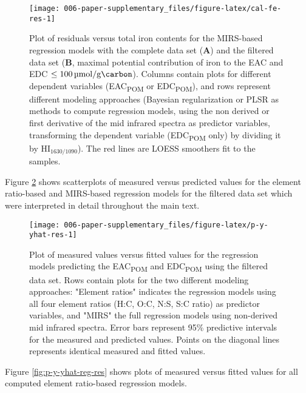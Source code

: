 \documentclass[draft,linenumbers]{agujournal2018}
\begin{document}
\begin{figure}[H]

{\centering \texttt{[image: 006-paper-supplementary\_files/figure-latex/cal-fe-res-1]} 

}

\caption{Plot of residuals versus total iron contents for the MIRS-based regression models with the complete data set (\textbf{A}) and the filtered data set (\textbf{B}, maximal potential contribution of iron to the EAC and EDC $\le\SI{100}{\micro\mol\per\gram\carbon}$). Columns contain plots for different dependent variables (EAC\textsubscript{POM} or EDC\textsubscript{POM}), and rows represent different modeling approaches (Bayesian regularization or PLSR as methods to compute regression models, using the non derived or first derivative of the mid infrared spectra as predictor variables, transforming the dependent variable (EDC\textsubscript{POM} only) by dividing it by HI$_\text{1630/1090}$). The red lines are LOESS smoothers fit to the samples.}\label{fig:cal-fe-res}
\end{figure}

\clearpage

Figure \ref{fig:p-y-yhat-res} shows scatterplots of measured versus
predicted values for the element ratio-based and MIRS-based regression
models for the filtered data set which were interpreted in detail
throughout the main text.

\begin{figure}[H]

{\centering \texttt{[image: 006-paper-supplementary\_files/figure-latex/p-y-yhat-res-1]} 

}

\caption{Plot of measured values versus fitted values for the regression models predicting the EAC\textsubscript{POM} and EDC\textsubscript{POM} using the filtered data set. Rows contain plots for the two different modeling approaches: "Element ratios" indicates the regression models using all four element ratios (H:C, O:C, N:S, S:C ratio) as predictor variables, and "MIRS" the full regression models using non-derived mid infrared spectra. Error bars represent 95\% predictive intervals for the measured and predicted values. Points on the diagonal lines represents identical measured and fitted values.}\label{fig:p-y-yhat-res}
\end{figure}

\clearpage

Figure \ref{fig:p-y-yhat-reg-res} shows plots of measured versus fitted
values for all computed element ratio-based regression models.
\end{document}
